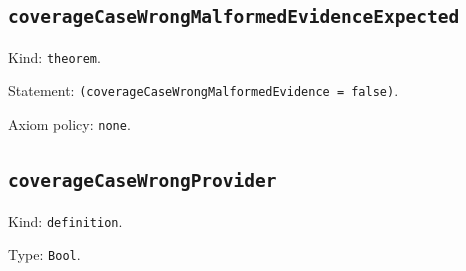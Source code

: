 \documentclass[11pt]{article}
\begin{document}
\subsection*{\texttt{coverageCaseWrongMalformedEvidenceExpected}}
\noindent Kind: \texttt{theorem}.\par
\noindent Statement: \texttt{(coverageCaseWrongMalformedEvidence = false)}.\par
\noindent Axiom policy: \texttt{none}.\par
\subsection*{\texttt{coverageCaseWrongProvider}}
\noindent Kind: \texttt{definition}.\par
\noindent Type: \texttt{Bool}.\par
\end{document}

